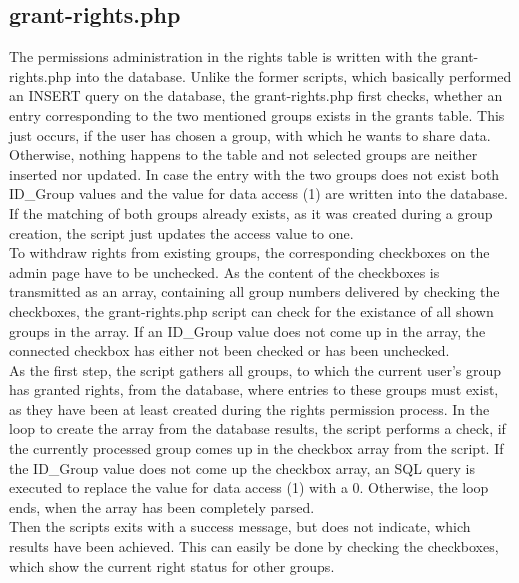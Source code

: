 \subsection{grant-rights.php}
The permissions administration in the rights table is written with the grant-rights.php into the database. Unlike the former scripts, which basically performed an INSERT query on 
the database, the grant-rights.php first checks, whether an entry corresponding to the two mentioned groups exists in the grants table. This just occurs, if the user has chosen 
a group, with which he wants to share data. Otherwise, nothing happens to the table and not selected groups are neither inserted nor updated. In case the entry with the two groups 
does not exist both ID\_Group values and the value for data access (1) are written into the database.\\
If the matching of both groups already exists, as it was created during a group creation, the script just updates the access value to one.\\
To withdraw rights from existing groups, the corresponding checkboxes on the admin page have to be unchecked. As the content of the checkboxes is transmitted as an array, containing all group numbers 
delivered by checking the checkboxes, the grant-rights.php script can check for the existance of all shown groups in the array. If an ID\_Group value does not come up in the array, the connected 
checkbox has either not been checked or has been unchecked.\\
As the first step, the script gathers all groups, to which the current user's group has granted rights, from the database, where entries to these groups must exist, as they have been at least 
created during the rights permission process. In the loop to create the array from the database results, the script performs a check, if the currently processed group comes up in the checkbox array 
from the script. If the ID\_Group value does not come up the checkbox array, an SQL query is executed to replace the value for data access (1) with a 0. Otherwise, the loop ends, when the array has 
been completely parsed.\\ 
Then the scripts exits with a success message, but does not indicate, which results have been achieved. This can easily be done by checking the checkboxes, which show the current right status for 
other groups.
